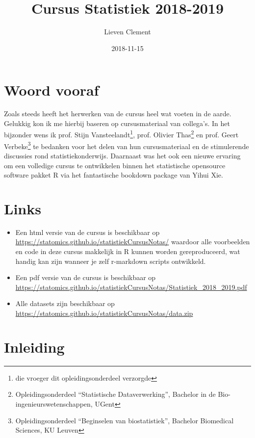 \documentclass[12pt,dutch,coursenotes]{book}
\title{Cursus Statistiek 2018-2019}
\author{Lieven Clement}
\date{2018-11-15}
\providecommand{\tightlist}{%
  \setlength{\itemsep}{0pt}\setlength{\parskip}{0pt}}
\let\rmarkdownfootnote\footnote%
\def\footnote{\protect\rmarkdownfootnote}
\theoremstyle{definition}
\theoremstyle{definition}
\theoremstyle{definition}
\theoremstyle{remark}
\begin{document}
\maketitle

{
\setcounter{tocdepth}{1}
\tableofcontents
}
\chapter*{Woord vooraf}\label{woord-vooraf}

Zoals steeds heeft het herwerken van de cursus heel wat voeten in de
aarde. Gelukkig kon ik me hierbij baseren op cursusmateriaal van
collega's. In het bijzonder wens ik prof. Stijn Vansteelandt\footnote{die
  vroeger dit opleidingsonderdeel verzorgde}, prof. Olivier
Thas\footnote{Opleidingsonderdeel ``Statistische Dataverwerking'',
  Bachelor in de Bio-ingenieurswetenschappen, UGent} en prof. Geert
Verbeke\footnote{Opleidingsonderdeel ``Beginselen van biostatistiek'',
  Bachelor Biomedical Sciences, KU Leuven} te bedanken voor het delen
van hun cursusmateriaal en de stimulerende discussies rond
statistiekonderwijs. Daarnaast was het ook een nieuwe ervaring om een
volledige cursus te ontwikkelen binnen het statistische opensource
software pakket R via het fantastische bookdown package van Yihui Xie.

\chapter*{Links}\label{links}

\begin{itemize}
\tightlist
\item
  Een html versie van de cursus is beschikbaar op
  \url{https://statomics.github.io/statistiekCursusNotas/} waardoor alle
  voorbeelden en code in deze cursus makkelijk in R kunnen worden
  gereproduceerd, wat handig kan zijn wanneer je zelf r-markdown scripts
  ontwikkeld.
\item
  Een pdf versie van de cursus is beschikbaar op
  \url{https://statomics.github.io/statistiekCursusNotas/Statistiek_2018_2019.pdf}
\item
  Alle datasets zijn beschikbaar op
  \url{https://statomics.github.io/statistiekCursusNotas/data.zip}
\end{itemize}

\chapter{Inleiding}\label{inleiding}
\end{document}
